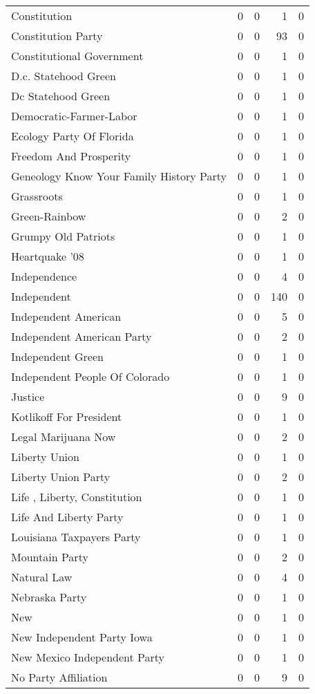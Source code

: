 \begin{supertabular}{lrrrr}
Constitution & 0 & 0 & 1 & 0\\
Constitution Party & 0 & 0 & 93 & 0\\
Constitutional Government & 0 & 0 & 1 & 0\\
D.c. Statehood Green & 0 & 0 & 1 & 0\\
Dc Statehood Green & 0 & 0 & 1 & 0\\
Democratic-Farmer-Labor & 0 & 0 & 1 & 0\\
Ecology Party Of Florida & 0 & 0 & 1 & 0\\
Freedom And Prosperity & 0 & 0 & 1 & 0\\
Geneology Know Your Family History Party & 0 & 0 & 1 & 0\\
Grassroots & 0 & 0 & 1 & 0\\
Green-Rainbow & 0 & 0 & 2 & 0\\
Grumpy Old Patriots & 0 & 0 & 1 & 0\\
Heartquake '08 & 0 & 0 & 1 & 0\\
Independence & 0 & 0 & 4 & 0\\
Independent & 0 & 0 & 140 & 0\\
Independent American & 0 & 0 & 5 & 0\\
Independent American Party & 0 & 0 & 2 & 0\\
Independent Green & 0 & 0 & 1 & 0\\
Independent People Of Colorado & 0 & 0 & 1 & 0\\
Justice & 0 & 0 & 9 & 0\\
Kotlikoff For President & 0 & 0 & 1 & 0\\
Legal Marijuana Now & 0 & 0 & 2 & 0\\
Liberty Union & 0 & 0 & 1 & 0\\
Liberty Union Party & 0 & 0 & 2 & 0\\
Life , Liberty, Constitution & 0 & 0 & 1 & 0\\
Life And Liberty Party & 0 & 0 & 1 & 0\\
Louisiana Taxpayers Party & 0 & 0 & 1 & 0\\
Mountain Party & 0 & 0 & 2 & 0\\
Natural Law & 0 & 0 & 4 & 0\\
Nebraska Party & 0 & 0 & 1 & 0\\
New & 0 & 0 & 1 & 0\\
New Independent Party Iowa & 0 & 0 & 1 & 0\\
New Mexico Independent Party & 0 & 0 & 1 & 0\\
No Party Affiliation & 0 & 0 & 9 & 0\\

\end{supertabular}
